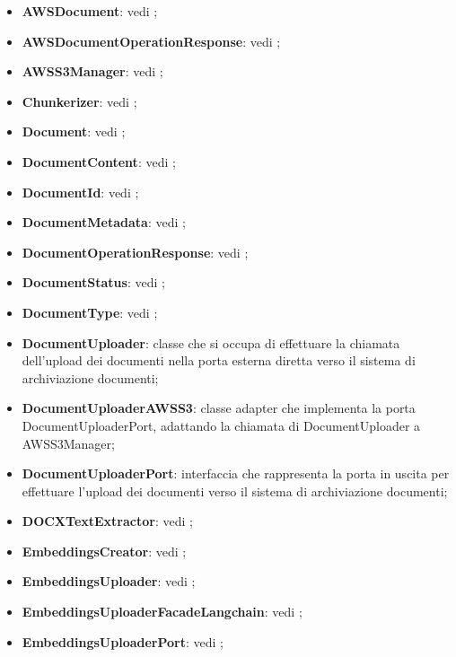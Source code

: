 \documentclass[10pt, a4paper]{article}
\begin{document}
\begin{itemize}
    \item \textbf{AWSDocument}: vedi ;
    \item \textbf{AWSDocumentOperationResponse}: vedi ;
    \item \textbf{AWSS3Manager}: vedi ;
    \item \textbf{Chunkerizer}: vedi ;
    \item \textbf{Document}: vedi ;
    \item \textbf{DocumentContent}: vedi ;
    \item \textbf{DocumentId}: vedi ;    
    \item \textbf{DocumentMetadata}: vedi ;
    \item \textbf{DocumentOperationResponse}: vedi ;
    \item \textbf{DocumentStatus}: vedi ;
    \item \textbf{DocumentType}: vedi ;
    \item \label{DocumentsUploader}\textbf{DocumentUploader}: classe che si occupa di effettuare la chiamata dell'upload dei documenti nella porta esterna diretta verso il sistema di archiviazione documenti;
    \item \label{DocumentsUploaderAWSS3}\textbf{DocumentUploaderAWSS3}: classe adapter che implementa la porta DocumentUploaderPort, adattando la chiamata di DocumentUploader a AWSS3Manager;
    \item \label{DocumentsUploaderPort}\textbf{DocumentUploaderPort}: interfaccia che rappresenta la porta in uscita per effettuare l'upload dei documenti verso il sistema di archiviazione documenti;
    \item \textbf{DOCXTextExtractor}: vedi ;
    \item \textbf{EmbeddingsCreator}: vedi ;
    \item \textbf{EmbeddingsUploader}: vedi ;
    \item \textbf{EmbeddingsUploaderFacadeLangchain}: vedi ;
    \item \textbf{EmbeddingsUploaderPort}: vedi ;

\end{itemize}
\end{document}
